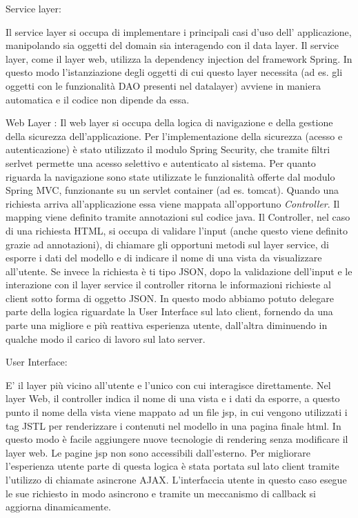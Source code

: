 Service layer:

Il service layer si occupa di implementare i principali casi d'uso
dell' applicazione, manipolando sia oggetti del domain sia interagendo
con il data layer. Il service layer, come il layer web, utilizza la
dependency injection del framework Spring. In questo modo
l'istanziazione degli oggetti di cui questo layer necessita (ad
es. gli oggetti con le funzionalità DAO presenti nel datalayer)
avviene in maniera automatica e il codice non dipende da essa. 

Web Layer : Il web layer si occupa della logica di navigazione e della
gestione della sicurezza dell'applicazione. Per l'implementazione
della sicurezza (acesso e autenticazione) è stato utilizzato il modulo
Spring Security, che tramite filtri serlvet permette una acesso
selettivo e autenticato al sistema.  Per quanto riguarda la
navigazione sono state utilizzate le funzionalità offerte dal modulo
Spring MVC, funzionante su un servlet container (ad
es. tomcat). Quando una richiesta arriva all'applicazione essa viene
mappata all'opportuno \emph{Controller}. Il mapping viene definito
tramite annotazioni sul codice java. Il Controller, nel caso di una
richiesta HTML, si occupa di validare l'input (anche questo viene
definito grazie ad annotazioni), di chiamare gli opportuni metodi sul
layer service, di esporre i dati del modello e di indicare il nome di
una vista da visualizzare all'utente. Se invece la richiesta è ti tipo
JSON, dopo la validazione dell'input e le interazione con il layer
service il controller ritorna le informazioni richieste al client sotto forma di oggetto JSON. In questo modo abbiamo potuto delegare
parte della logica riguardate la User Interface sul lato client,
fornendo da una parte una migliore e più reattiva esperienza utente,
dall'altra diminuendo in qualche modo il carico di lavoro sul lato server.

User Interface:

E' il layer più vicino all'utente e l'unico con cui interagisce
direttamente. Nel layer Web, il controller indica il nome di
una vista e i dati da esporre, a questo punto il nome della vista
viene mappato ad un file jsp, in cui vengono utilizzati i tag JSTL per
renderizzare i contenuti nel modello in una pagina finale html. In
questo modo è facile aggiungere nuove tecnologie di rendering senza
modificare il layer web. Le pagine jsp non sono accessibili dall'esterno.
Per migliorare l'esperienza utente parte di questa logica è stata
portata sul lato client tramite l'utilizzo di chiamate asincrone
AJAX. L'interfaccia utente in questo caso esegue le sue richiesto in
modo asincrono e tramite un meccanismo di callback si aggiorna dinamicamente.




